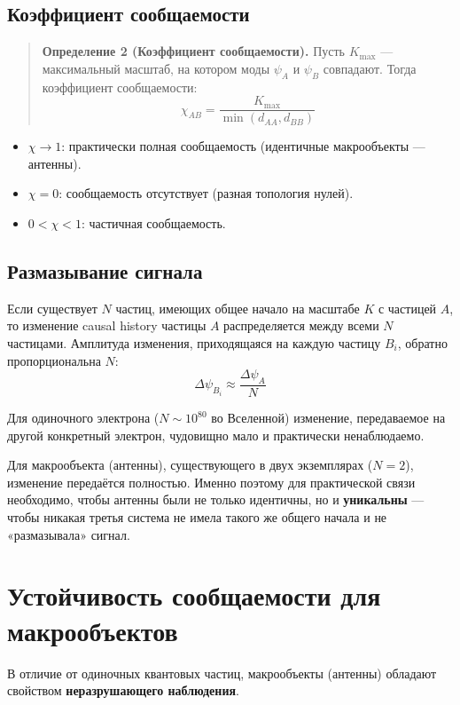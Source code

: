 \documentclass[12pt,a4paper]{article}
\begin{document}
\subsection{Коэффициент сообщаемости}

\begin{quote}
\textbf{Определение 2 (Коэффициент сообщаемости).} Пусть $K_{\max}$ --- максимальный масштаб, на котором моды $\psi_A$ и $\psi_B$ совпадают. Тогда коэффициент сообщаемости:
\begin{equation}
    \chi_{AB} = \frac{K_{\max}}{\min(d_{AA}, d_{BB})}
\end{equation}
\end{quote}

\begin{itemize}
    \item $\chi \to 1$: практически полная сообщаемость (идентичные макрообъекты --- антенны).
    \item $\chi = 0$: сообщаемость отсутствует (разная топология нулей).
    \item $0 < \chi < 1$: частичная сообщаемость.
\end{itemize}

\subsection{Размазывание сигнала}
Если существует $N$ частиц, имеющих общее начало на масштабе $K$ с частицей $A$, то изменение causal history частицы $A$ распределяется между всеми $N$ частицами. Амплитуда изменения, приходящаяся на каждую частицу $B_i$, обратно пропорциональна $N$:
\begin{equation}
    \Delta\psi_{B_i} \approx \frac{\Delta\psi_A}{N}
\end{equation}

Для одиночного электрона ($N \sim 10^{80}$ во Вселенной) изменение, передаваемое на другой конкретный электрон, чудовищно мало и практически ненаблюдаемо.

Для макрообъекта (антенны), существующего в двух экземплярах ($N = 2$), изменение передаётся полностью. Именно поэтому для практической связи необходимо, чтобы антенны были не только идентичны, но и \textbf{уникальны} --- чтобы никакая третья система не имела такого же общего начала и не «размазывала» сигнал.

\section{Устойчивость сообщаемости для макрообъектов}
В отличие от одиночных квантовых частиц, макрообъекты (антенны) обладают свойством \textbf{неразрушающего наблюдения}.
\end{document}
